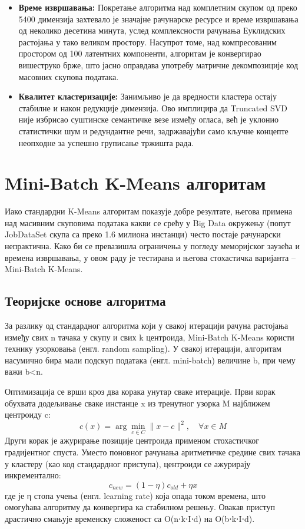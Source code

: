 \documentclass[a4paper,12pt]{report}
\begin{document}
	\begin{itemize}

	\item \textbf{Време извршавања:} Покретање алгоритма над комплетним скупом од преко 5400 димензија захтевало је значајне рачунарске ресурсе и време извршавања од неколико десетина минута, услед комплексности рачунања Еуклидских растојања у тако великом простору. Насупрот томе, над компресованим простором од 100 латентних компоненти, алгоритам је конвергирао вишеструко брже, што јасно оправдава употребу матричне декомпозиције код масовних скупова података.
	
	\item \textbf{Квалитет кластеризације:} Занимљиво је да вредности кластера остају стабилне и након редукције димензија. Ово имплицира да Truncated SVD није избрисао суштинске семантичке везе између огласа, већ је уклонио статистички шум и редундантне речи, задржавајући само кључне концепте неопходне за успешно груписање тржишта рада.

\end{itemize}	
	
	\section{Mini-Batch K-Means алгоритам}
	Иако стандардни K-Means алгоритам показује добре резултате, његова примена над масивним скуповима података какви се срећу у Big Data окружењу (попут JobDataSet скупа са преко 1.6 милиона инстанци) често постаје рачунарски непрактична. Како би се превазишла ограничења у погледу меморијског заузећа и времена извршавања, у овом раду је тестирана и његова стохастичка варијанта – Mini-Batch K-Means.
	
	\subsection{Теоријске основе алгоритма}
	За разлику од стандардног алгоритма који у свакој итерацији рачуна растојања између свих n тачака у скупу и свих k центроида, Mini-Batch K-Means користи технику узорковања (енгл. random sampling). У свакој итерацији, алгоритам насумично бира мали подскуп података (енгл. mini-batch) величине b, при чему важи b<n.
	
	Оптимизација се врши кроз два корака унутар сваке итерације. Први корак обухвата додељивање сваке инстанце x из тренутног узорка M најближем центроиду c:
	\[ c(x) = \arg \min_{c \in C} \|x - c\|^2, \quad \forall x \in M \]
	Други корак је ажурирање позиције центроида применом стохастичког градијентног спуста. Уместо поновног рачунања аритметичке средине свих тачака у кластеру (као код стандардног приступа), центроиди се ажурирају инкрементално:
	\[ c_{new} = (1 - \eta)c_{old} + \eta x \]
	где је η стопа учења (енгл. learning rate) која опада током времена, што омогућава алгоритму да конвергира ка стабилном решењу. Овакав приступ драстично смањује временску сложеност са O(n⋅k⋅I⋅d) на O(b⋅k⋅I⋅d).
\end{document}
